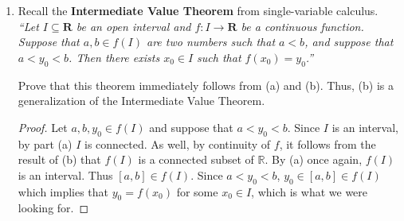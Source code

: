 \documentclass{article}
\newcommand{\R}{\mathbf{R}}
\theoremstyle{plain} %
\numberwithin{thm}{section} %
\theoremstyle{definition}
\begin{document}
\begin{enumerate}[label=(\alph*)]
\begin{proof}
            Now, we will show that \(f^{-1} (A)\) is non-empty and open.
            
            We know that \(A\) is non-empty, so there exists an element \(y \in A\). By the definition of image, \(y=f(x)\) for some \(x \in C\). it follows that \(x \in f^{-1} (A)\). Thus \(f^{-1} (A)\) is non-empty.
            
            To show that \(f^{-1} (A)\) is open, we use the topological definition of continuity of \(f\) to conclude that since \(A\) is open, \(f^{-1} (A)\) is open as well.

            We can apply the same argument for \(f^{-1} (B)\) and show that the set is non-empty and open as well.

            Thus \(f^{-1} (A), f^{-1} (B)\) are non-empty, disjoint, and open. It remains to show that \(f^{-1} (A) \cup f^{-1} (B) = C\). The \(\subseteq\) direction is trivial, so we only show the other direction.

            Let \(x \in C\). We know that \(f(x) \in f(C)\), which means that either \(f(x) \in A\) or \(f(x) \in B\). It follows that \(x \in f^{-1} (A)\) or \(x \in f^{-1} (B) \implies x \in f^{-1} (A) \cup f^{-1} (B)\). Thus \(f^{-1} (A) \cup f^{-1} (B) = C\).

            We conclude that \(C\) is a disconnected subset of \(X\), which shows that the contrapositive of the original statement is true, completing the proof.
            
        \end{proof}
        
        \item Recall the \textbf{Intermediate Value Theorem} from single-variable calculus. \textit{``Let $I\subseteq \R$ be an open interval and $f:I\rightarrow \R$ be a continuous function. Suppose that $a,b\in f(I)$ are two numbers such that $a<b$, and suppose that $a<y_0<b$. Then there exists $x_0\in I$ such that $f(x_0)=y_0$.''}

        Prove that this theorem immediately follows from (a) and (b). Thus, (b) is a generalization of the Intermediate Value Theorem.

        \begin{proof}
            Let \(a,b,y_0 \in f(I)\) and suppose that \(a<y_0<b\). Since \(I\) is an interval, by part (a) \(I\) is connected. As well, by continuity of \(f\), it follows from the result of (b) that \(f(I)\) is a connected subset of \(\mathbb{R}\). By (a) once again, \(f(I)\) is an interval. Thus \([a,b] \in f(I)\). Since \(a<y_0<b\), \(y_0 \in [a,b] \in f(I)\) which implies that \(y_0 = f(x_0)\) for some \(x_0 \in I\), which is what we were looking for.
        \end{proof}
    \end{enumerate}
\end{document}
